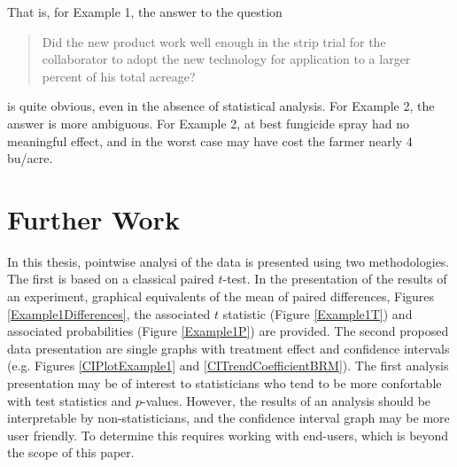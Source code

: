 \documentclass[phdcss]{SDSUThesis}
\begin{document}
That is, for Example 1, the answer to the question 
\begin{quotation}
   Did the new product work well enough in the strip trial for the collaborator to adopt the new technology for application to a larger percent of his total acreage?
\end{quotation} 
is quite obvious, even in the absence of statistical analysis. For Example 2, the answer is more ambiguous. For Example 2, at best fungicide spray had no meaningful effect, and in the worst case may have cost the farmer nearly 4 bu/acre.

\clearpage

\chapter{Further Work}

In this thesis, pointwise analysi of the data is presented using two methodologies. The first is based on a classical paired $t$-test. In the presentation of the results of an experiment, graphical equivalents of the mean of paired differences, Figures \ref{Example1Differences}, the associated $t$ statistic (Figure \ref{Example1T}) and associated probabilities (Figure \ref{Example1P}) are provided. The second proposed data presentation are single graphs with treatment effect and confidence intervals (e.g. Figures \ref{CIPlotExample1} and \ref{CITrendCoefficientBRM}). The first analysis presentation may be of interest to statisticians who tend to be more confortable with test statistics and $p$-values. However, the results of an analysis should be interpretable by non-statisticians, and the confidence interval graph may be more user friendly. To determine this requires working with end-users, which is beyond the scope of this paper. 

\end{document}
